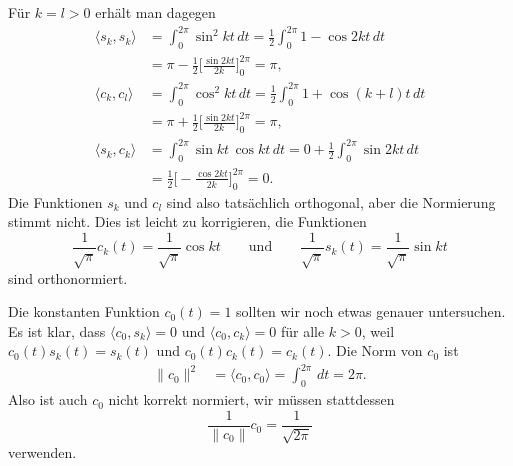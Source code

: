Für $k=l>0$ erhält man dagegen
\begin{align*}
\langle s_k, s_k\rangle
&=
\int_0^{2\pi} \sin^2 kt \,dt
=
\frac12\int_0^{2\pi} 1 - \cos2kt\,dt
\\
&=
\pi
-
\frac12\biggl[ \frac{\sin2kt}{2k} \biggr]_0^{2\pi}
=
\pi,
\\
\langle c_k, c_l\rangle
&=
\int_0^{2\pi} \cos^2 kt \,dt
=
\frac12\int_0^{2\pi} 1 + \cos(k+l)t\,dt
\\
&=
\pi
+
\frac12\biggl[ \frac{\sin 2kt}{2k}\biggr]_0^{2\pi}
=
\pi,
\\
\langle s_k, c_k\rangle
&=
\int_0^{2\pi} \sin kt\, \cos kt \,dt
=
0
+
\frac12\int_0^{2\pi} \sin 2k t\,dt
\\
&=
\frac12\biggl[-\frac{\cos2kt}{2k}\biggr]_0^{2\pi}
=
0.
\end{align*}
Die Funktionen $s_k$ und $c_l$ sind also tatsächlich orthogonal, aber
die Normierung stimmt nicht.
Dies ist leicht zu korrigieren, die Funktionen
\[
\frac1{\sqrt{\pi}} c_k(t) = \frac{1}{\sqrt{\pi}} \cos kt
\qquad\text{und}\qquad
\frac1{\sqrt{\pi}} s_k(t) = \frac{1}{\sqrt{\pi}} \sin kt
\]
sind orthonormiert.

Die konstanten Funktion $c_0(t)=1$ sollten wir noch etwas genauer untersuchen.
Es ist klar, dass $\langle c_0,s_k\rangle = 0$ und $\langle c_0,c_k\rangle=0$
für alle $k>0$, weil $c_0(t)s_k(t)=s_k(t)$ und $c_0(t)c_k(t)=c_k(t)$.
Die Norm von $c_0$ ist
\begin{align*}
\|c_0\|^2&=\langle c_0,c_0\rangle = \int_0^{2\pi}\,dt = 2\pi.
\end{align*}
Also ist auch $c_0$ nicht korrekt normiert, wir müssen stattdessen
\[
\frac1{\|c_0\|}c_0 = \frac{1}{\sqrt{2\pi}}
\]
verwenden.


